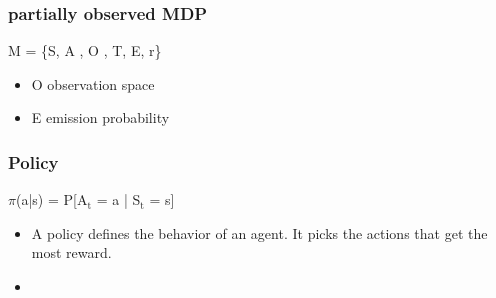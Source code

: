 \documentclass[11pt]{article}
\begin{document}
\subsubsection{partially observed MDP}
\label{sec-3-4-1}
M = \{S, A , O , T, E, r\}
\begin{itemize}
\item O observation space
\item E emission probability
\end{itemize}
\subsubsection{Policy}
\label{sec-3-4-2}
$\pi$(a|s) = P[A$_{\text{t}}$ = a | S$_{\text{t}}$ = s]
\begin{itemize}
\item A policy defines the behavior of an agent. It picks the actions that get the most reward.
\item 
\end{itemize}
\end{document}
